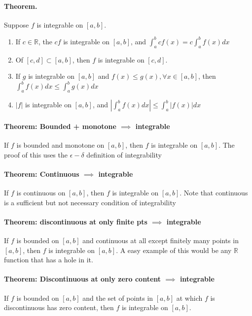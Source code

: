 \documentclass[11pt]{article}
\begin{document}
\paragraph{Theorem.} Suppose $f$ is integrable on $[a,b]$.
\begin{enumerate}
    \item If $c\in \mathbb{R}$, the $cf$ is integrable on $[a,b]$, and $\int_a^b cf(x) = c\int_a^bf(x)dx$
    \item Of $[c,d] \subset [a,b]$, then $f$ is integrable on $[c,d]$.
    \item If $g$ is integrable on $[a,b]$ and $f(x) \leq g(x),\forall x \in [a,b]$, then $\int_a^b f(x)dx\leq \int_a^b g(x)dx$
    \item $|f|$ is integrable on $[a,b]$, and $\left|\int_a^bf(x)dx\right| \leq \int_a^b |f(x)|dx$
\end{enumerate}

\paragraph{Theorem: Bounded + monotone $\implies$ integrable} If $f$ is bounded and monotone on $[a,b]$, then $f$ is integrable on $[a,b]$. The proof of this uses the $\epsilon-\delta$ definition of integrability

\paragraph{Theorem: Continuous $\implies$ integrable} If $f$ is continuous on $[a,b]$, then $f$ is integrable on $[a,b]$. Note that continuous is a sufficient but not necessary condition of integrability

\paragraph{Theorem: discontinuous at only finite pts $\implies$ integrable} If $f$ is bounded on $[a,b]$ and continuous at all except finitely many points in $[a,b]$, then $f$ is integrable on $[a,b]$. A easy example of this would be any $\mathbb{R}$ function that has a hole in it.

\paragraph{Theorem: Discontinuous at only zero content $\implies$ integrable} If $f$ is bounded on $[a,b]$ and the set of points in $[a,b]$ at which $f$ is discontinuous has zero content, then $f$ is integrable on $[a,b]$.
\end{document}
